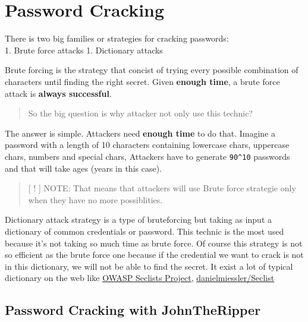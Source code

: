 \documentclass{assets/ipesethesis}
\begin{document}
\hypertarget{password-cracking}{%
\chapter*{Password Cracking}\label{password-cracking}}

There is two big families or strategies for cracking passwords:\\
1. Brute force attacks
1. Dictionary attacks

Brute forcing is the strategy that concist of trying every possible combination of characters until finding the right secret. Given \textbf{enough time}, a brute force
attack is \textbf{always successful}.

\begin{quote}
So the big question is why attacker not only use this technic?
\end{quote}

The answer is simple. Attackers need \textbf{enough time} to do that. Imagine a password with a length of 10 characters containing lowercase chars, uppercase chars,
numbers and special chars, Attackers have to generate \texttt{90\^{}10} passwords and that will take ages (years in this case).

\begin{quote}
{[} ! {]} NOTE: That means that attackers will use Brute force strategie only when they have no more possiblities.
\end{quote}

Dictionary attack strategy is a type of bruteforcing but taking as input a dictionary of common credentials or password. This technic is the most used because it's
not taking so much time as brute force. Of course this strategy is not so efficient as the brute force one because if the credential we want to crack is not in
this dictionary, we will not be able to find the secret. It exist a lot of typical dictionary on the web like \href{https://www.owasp.org/index.php/OWASP_SecLists_Project}{OWASP Seclists Project},
\href{https://github.com/danielmiessler/SecLists}{danielmiessler/Seclist}

\hypertarget{password-cracking-with-johntheripper}{%
\section*{Password Cracking with JohnTheRipper}\label{password-cracking-with-johntheripper}}
\end{document}
